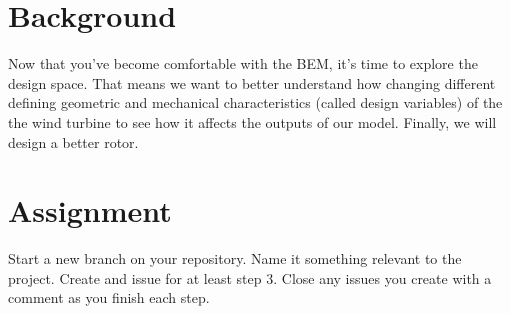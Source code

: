 \documentclass[12pt]{article}
\begin{document}
	

\section{Background}

Now that you've become comfortable with the BEM, it's time to explore the design space.
That means we want to better understand how changing different defining geometric and mechanical characteristics (called design variables) of the the wind turbine to see how it affects the outputs of our model. 
Finally, we will design a better rotor. 



\section{Assignment}
Start a new branch on your repository. Name it something relevant to the project. Create and issue for at least step 3. Close any issues you create with a comment as you finish each step. 
\end{document}
